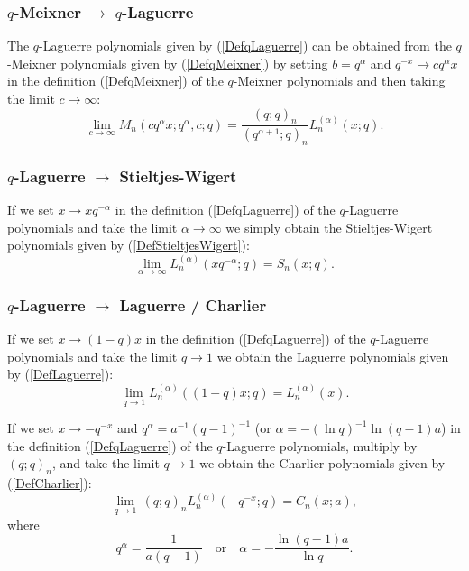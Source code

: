 \documentclass[envcountchap,graybox]{svmono}
\newcounter{rom}
\begin{document}
\subsubsection*{$q$-Meixner $\rightarrow$ $q$-Laguerre}
The $q$-Laguerre polynomials given by (\ref{DefqLaguerre}) can be obtained
from the $q$-Meixner polynomials given by (\ref{DefqMeixner}) by setting
$b=q^{\alpha}$ and $q^{-x}\rightarrow cq^{\alpha}x$ in the definition
(\ref{DefqMeixner}) of the $q$-Meixner polynomials and then taking the limit
$c\rightarrow\infty$:
$$\lim_{c\rightarrow\infty}M_n(cq^{\alpha}x;q^{\alpha},c;q)=
\frac{(q;q)_n}{(q^{\alpha+1};q)_n}L_n^{(\alpha)}(x;q).$$

\subsubsection*{$q$-Laguerre $\rightarrow$ Stieltjes-Wigert}
If we set $x\rightarrow xq^{-\alpha}$ in the definition
(\ref{DefqLaguerre}) of the $q$-Laguerre polynomials and take the limit
$\alpha\rightarrow\infty$ we simply obtain the Stieltjes-Wigert polynomials given
by (\ref{DefStieltjesWigert}):
\begin{equation}
\lim_{\alpha\rightarrow\infty}L_n^{(\alpha)}\left(xq^{-\alpha};q\right)=S_n(x;q).
\end{equation}

\subsubsection*{$q$-Laguerre $\rightarrow$ Laguerre / Charlier}
If we set $x\rightarrow (1-q)x$ in the definition (\ref{DefqLaguerre})
of the $q$-Laguerre polynomials and take the limit $q\rightarrow 1$ we obtain
the Laguerre polynomials given by (\ref{DefLaguerre}):
\begin{equation}
\lim_{q\rightarrow 1}L_n^{(\alpha)}((1-q)x;q)=L_n^{(\alpha)}(x).
\end{equation}

If we set $x\rightarrow -q^{-x}$ and $q^{\alpha}=a^{-1}(q-1)^{-1}$ (or
$\alpha=-(\ln q)^{-1}\ln (q-1)a$) in the definition (\ref{DefqLaguerre}) of the
$q$-Laguerre polynomials, multiply by $(q;q)_n$, and take the limit
$q\rightarrow 1$ we obtain the Charlier polynomials given by (\ref{DefCharlier}):
\begin{equation}
\lim_{q\rightarrow 1}\,(q;q)_nL_n^{(\alpha)}(-q^{-x};q)=C_n(x;a),
\end{equation}
where
$$q^{\alpha}=\frac{1}{a(q-1)}\quad\textrm{or}\quad\alpha=-\frac{\ln (q-1)a}{\ln q}.$$
\end{document}

